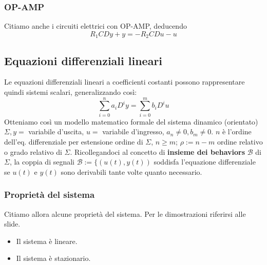 \documentclass[11pt]{article}
\begin{document}
\subsubsection{OP-AMP}
Citiamo anche i circuiti elettrici con OP-AMP, deducendo
\begin{displaymath}
    R_1CDy + y = -R_2CDu-u
\end{displaymath}
\subsection{Equazioni differenziali lineari}
Le equazioni differenziali lineari a coefficienti costanti possono rappresentare quindi sistemi scalari, generalizzando così:
\begin{displaymath}
    \sum_{i=0}^n a_i D^i y = \sum_{i=0}^m b_i D^i u
\end{displaymath}
Otteniamo così un modello matematico formale del sistema dinamico (orientato) $\Sigma, y =$ variabile d'uscita, $u=$ variabile d'ingresso, $a_n \neq 0, b_m \neq 0$. $n$ è l'ordine dell'eq. differenziale per estensione ordine di $\Sigma$, $n\ge m$; $\rho := n-m$ ordine relativo o grado relativo di $\Sigma$.
Ricollegandoci al concetto di \textbf{insieme dei behaviors} $\mathcal{B}$ di $\Sigma$, la coppia di segnali $\mathcal{B} := \{\left(u(t), y(t)\right)$ soddisfa l'equazione differenziale se $u(t)$ e $y(t)$ sono derivabili tante volte quanto necessario.
\subsubsection{Proprietà del sistema}
Citiamo allora alcune proprietà del sistema. Per le dimostrazioni riferirsi alle slide.
\begin{itemize}
    \item Il sistema è lineare.
    \item Il sistema è stazionario.
\end{itemize}
\end{document}
